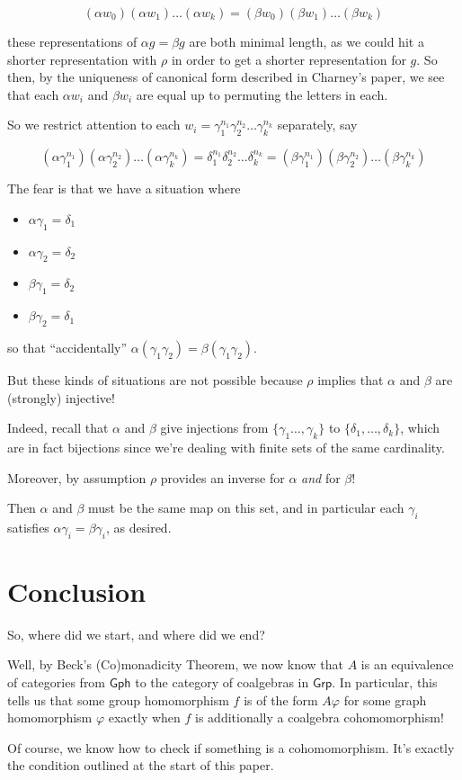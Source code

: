 \documentclass[12pt]{article}
\theoremstyle{definition}
\theoremstyle{theorem}
\begin{document}
\[ (\alpha w_0) (\alpha w_1) \ldots (\alpha w_k) = (\beta w_0) (\beta w_1) \ldots (\beta w_k) \]

these representations of $\alpha g = \beta g$ are both minimal length, as 
we could hit a shorter representation with $\rho$ in order to get a 
shorter representation for $g$. So then, by the uniqueness of canonical form 
described in Charney's paper, 
we see that each $\alpha w_i$ and $\beta w_i$ are equal up to permuting the 
letters in each. 

So we restrict attention to each 
$w_i = \gamma_1^{n_1} \gamma_2^{n_2} \ldots \gamma_k^{n_k}$ separately, say

\[ 
  (\alpha \gamma_1^{n_1}) (\alpha \gamma_2^{n_2}) \ldots (\alpha \gamma_k^{n_k}) = 
  \delta_1^{n_1} \delta_2^{n_2} \ldots \delta_k^{n_k} =
  (\beta \gamma_1^{n_1}) (\beta \gamma_2^{n_2}) \ldots (\beta \gamma_k^{n_k})
\]

The fear is that we have a situation where 

\begin{itemize}
    \item $\alpha \gamma_1 = \delta_1$
    \item $\alpha \gamma_2 = \delta_2$
    \item $\beta \gamma_1 = \delta_2$
    \item $\beta \gamma_2 = \delta_1$
\end{itemize}

so that ``accidentally'' $\alpha(\gamma_1 \gamma_2) = \beta(\gamma_1 \gamma_2)$.

But these kinds of situations are not possible because $\rho$ implies that
$\alpha$ and $\beta$ are (strongly) injective!

Indeed, recall that $\alpha$ and $\beta$ give injections from $\{ \gamma_1 \ldots, \gamma_k \}$
to $\{ \delta_1, \ldots, \delta_k \}$, which are in fact bijections since we're
dealing with finite sets of the same cardinality. 

Moreover, by assumption $\rho$ provides an inverse for $\alpha$ \emph{and} 
for $\beta$!

Then $\alpha$ and $\beta$ must be the same map on this set, and in particular
each $\gamma_i$ satisfies $\alpha \gamma_i = \beta \gamma_i$, as desired.

\section{Conclusion}

So, where did we start, and where did we end?

Well, by Beck's (Co)monadicity Theorem, we now know that $A$ is an
equivalence of categories from $\mathsf{Gph}$ to the category of coalgebras
in $\mathsf{Grp}$. In particular, this tells us that some group homomorphism
$f$ is of the form $A \varphi$ for some graph homomorphism $\varphi$
exactly when $f$ is additionally a coalgebra cohomomorphism!

Of course, we know how to check if something is a cohomomorphism. It's exactly
the condition outlined at the start of this paper.

% 
% 
\end{document}
